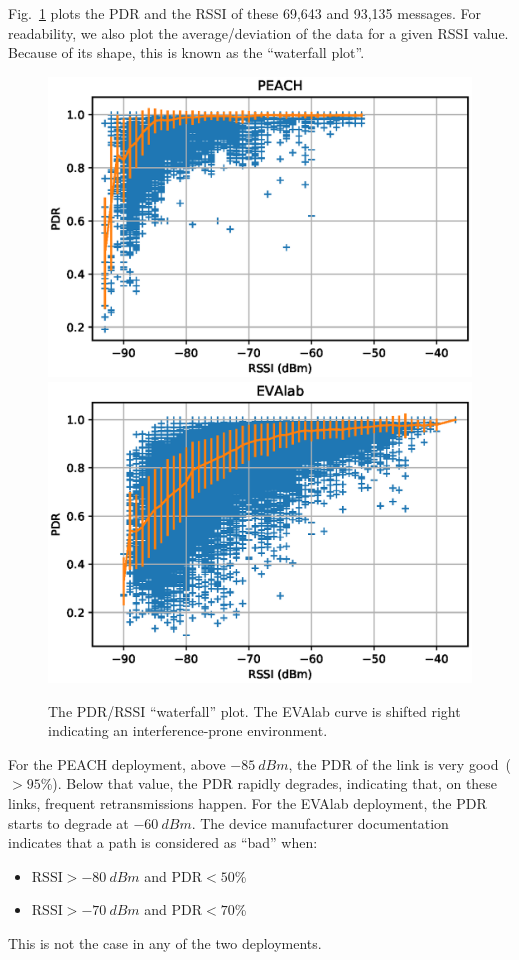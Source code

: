 \documentclass{elsarticle}
\begin{document}

Fig.~\ref{fig:waterfall} plots the PDR and the RSSI of these 69,643 and 93,135 messages.
For readability, we also plot the average/deviation of the data for a given RSSI value.
Because of its shape, this is known as the ``waterfall plot''.

\begin{figure}
    \includegraphics[width=0.5\columnwidth]{waterfall_peach.eps}
    \includegraphics[width=0.5\columnwidth]{waterfall.eps}
    \caption{
        The PDR/RSSI ``waterfall'' plot. The EVAlab curve is shifted right indicating an interference-prone environment.
    }
    \label{fig:waterfall}
\end{figure}

For the PEACH deployment, above $-85~dBm$, the PDR of the link is very good~($>95$\%).
Below that value, the PDR rapidly degrades, indicating that, on these links, frequent retransmissions happen.
For the EVAlab deployment, the PDR starts to degrade at $-60~dBm$.
The device manufacturer documentation~\cite{smip_app_note} indicates that a path is considered as ``bad'' when:

\begin{itemize}
    \item RSSI$>-80~dBm$ and PDR$<50$\%
    \item RSSI$>-70~dBm$ and PDR$<70$\%
\end{itemize}

This is not the case in any of the two deployments.\\

\end{document}
